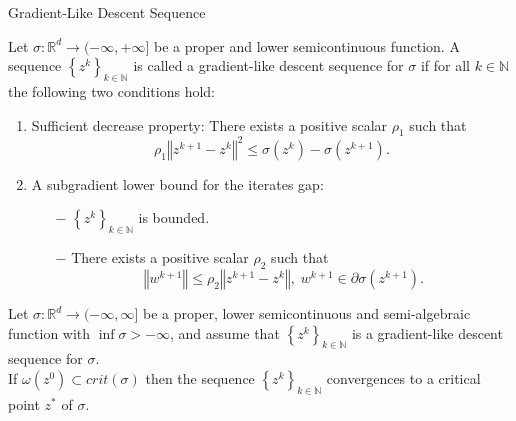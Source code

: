 \documentclass[9pt,handout]{beamer} %
\newcommand{\nn}{\mathbb{N}} %
\newcommand{\rr}{\mathbb{R}} %
\newcommand{\norm}[1]{\left\Vert {#1} \right\Vert} %
\begin{document}
	\begin{frame}{Gradient-Like Descent Sequence}
		\begin{definition} \label{gradient_like_seq_def}
			Let $\sigma: \rr^d \rightarrow (-\infty, +\infty]$ be a proper and lower semicontinuous function. A sequence $\left\lbrace z^k \right\rbrace_{k \in \nn}$ is called a {\dblue gradient-like descent sequence} for $\sigma$ if for all $k \in \nn$ the following two conditions hold:
			\begin{enumerate}[(C1)]
				\item {\dblue Sufficient decrease property}: There exists a positive scalar $\rho_1$ such that
				\begin{equation*}
					\rho_1 \norm{z^{k+1} - z^k}^2 \leq \sigma\left( z^k \right) - \sigma \left( z^{k+1} \right) .
				\end{equation*}
				\item {\dblue A subgradient lower bound for the iterates gap}:
				\begin{itemize}
					\item[$-$] $\left\lbrace z^k \right\rbrace_{k \in \nn}$ is bounded.
					\item[$-$] There exists a positive scalar $\rho_2$ such that
					\begin{equation*}
						\norm{w^{k+1}} \leq \rho_2 \norm{z^{k+1} - z^k}, \; w^{k+1} \in \partial\sigma \left( z^{k+1}\right).
					\end{equation*}
				\end{itemize}
			\end{enumerate}
		\end{definition}
		\pause
		\begin{theorem} \label{SDP_SGP_conv_thrm}
			Let $\sigma:\rr^d \rightarrow (-\infty,\infty]$ be a proper, lower semicontinuous and semi-algebraic function with $\inf \sigma > -\infty$, and assume that $\left\lbrace z^k \right\rbrace_{k \in \nn}$ is a gradient-like descent sequence for $\sigma$. \\ If $\omega\left( z^0 \right) \subset crit(\sigma)$ then the sequence $\left\lbrace z^k \right\rbrace_{k \in \nn}$ convergences to a critical point $z^{*}$ of $\sigma$.
		\end{theorem}
	\end{frame}
\end{document}
